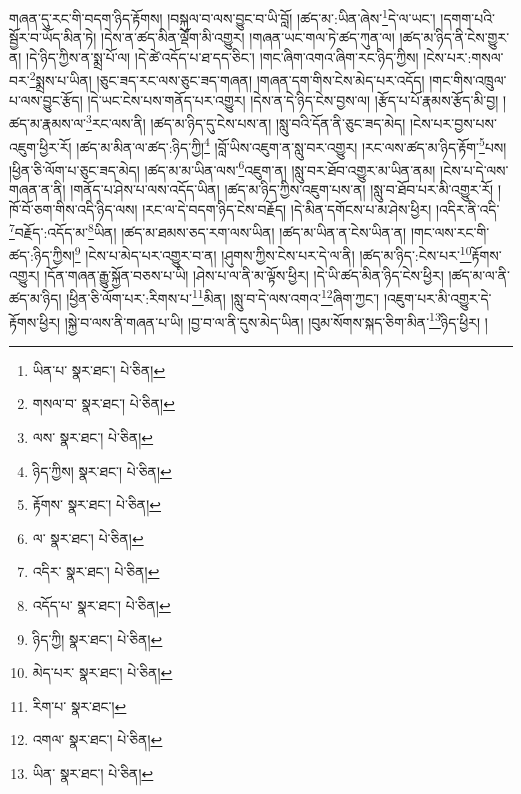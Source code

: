 གཞན་དུ་རང་གི་བདག་ཉིད་རྟོགས། །བསྐུལ་བ་ལས་བྱུང་བ་ཡི་བློ། །ཚད་མ་:ཡིན་ཞེས་\footnote{ཡིན་པ་  སྣར་ཐང་།  པེ་ཅིན། }དེ་ལ་ཡང་། །དགག་པའི་སྦྱོར་བ་ཡོད་མིན་ཏེ། །དེས་ན་ཚད་མིན་ལྡོག་མི་འགྱུར། །གཞན་ཡང་གལ་ཏེ་ཚད་ཀུན་ལ། །ཚད་མ་ཉིད་ནི་ངེས་གྱུར་ན། །དེ་ཉིད་ཀྱིས་ན་སྨྲ་པོ་ལ། །དེ་ཚེ་འདོད་པ་ཐ་དད་ཅིང་། །གང་ཞིག་འགའ་ཞིག་རང་ཉིད་ཀྱིས། །ངེས་པར་:གསལ་བར་\footnote{གསལ་བ་  སྣར་ཐང་།  པེ་ཅིན། }སྨྲས་པ་ཡིན། །ཅུང་ཟད་རང་ལས་ཅུང་ཟད་གཞན། །གཞན་དག་གིས་ངེས་མེད་པར་འདོད། །གང་གིས་འཁྲུལ་པ་ལས་བྱུང་རྩོད། །དེ་ཡང་ངེས་པས་གནོད་པར་འགྱུར། །དེས་ན་དེ་ཉིད་ངེས་བྱས་ལ། །རྩོད་པ་པོ་རྣམས་རྩོད་མི་བྱ། །ཚད་མ་རྣམས་ལ་\footnote{ལས་  སྣར་ཐང་།  པེ་ཅིན། }རང་ལས་ནི། །ཚད་མ་ཉིད་དུ་ངེས་པས་ན། །སླུ་བའི་དོན་ནི་ཅུང་ཟད་མེད། །ངེས་པར་བྱས་པས་འཇུག་ཕྱིར་རོ། །ཚད་མ་མིན་ལ་ཚད་:ཉིད་ཀྱི།\footnote{ཉིད་ཀྱིས།  སྣར་ཐང་།  པེ་ཅིན། } །བློ་ཡིས་འཇུག་ན་སླུ་བར་འགྱུར། །རང་ལས་ཚད་མ་ཉིད་རྟོག་\footnote{རྟོགས་  སྣར་ཐང་།  པེ་ཅིན། }པས། །ཕྱིན་ཅི་ལོག་པ་ཅུང་ཟད་མེད། །ཚད་མ་མ་ཡིན་ལས་\footnote{ལ་  སྣར་ཐང་།  པེ་ཅིན། }འཇུག་ན། །སླུ་བར་ཐོབ་འགྱུར་མ་ཡིན་ནམ། །ངེས་པ་དེ་ལས་གཞན་ན་ནི། །གནོད་པ་ཤེས་པ་ལས་འདོད་ཡིན། །ཚད་མ་ཉིད་ཀྱིས་འཇུག་པས་ན། །སླུ་བ་ཐོབ་པར་མི་འགྱུར་རོ། །ཁོ་བོ་ཅག་གིས་འདི་ཉིད་ལས། །རང་ལ་དེ་བདག་ཉིད་ངེས་བརྗོད། །དེ་མིན་དགོངས་པ་མ་ཤེས་ཕྱིར། །འདིར་ནི་འདི་\footnote{འདིར་  སྣར་ཐང་།  པེ་ཅིན། }བརྗོད་:འདོད་མ་\footnote{འདོད་པ་  སྣར་ཐང་།  པེ་ཅིན། }ཡིན། །ཚད་མ་ཐམས་ཅད་རག་ལས་ཡིན། །ཚད་མ་ཡིན་ན་ངེས་ཡིན་ན། །གང་ལས་རང་གི་ཚད་:ཉིད་ཀྱིས།\footnote{ཉིད་ཀྱི།  སྣར་ཐང་།  པེ་ཅིན། } །ངེས་པ་མེད་པར་འགྱུར་བ་ན། །ཤུགས་ཀྱིས་ངེས་པར་དེ་ལ་ནི། །ཚད་མ་ཉིད་:ངེས་པར་\footnote{མེད་པར་  སྣར་ཐང་།  པེ་ཅིན། }རྟོགས་འགྱུར། །དོན་གཞན་རྒྱུ་སྐྱོན་བཅས་པ་ཡི། །ཤེས་པ་ལ་ནི་མ་ལྟོས་ཕྱིར། །དེ་ཡི་ཚད་མིན་ཉིད་ངེས་ཕྱིར། །ཚད་མ་ལ་ནི་ཚད་མ་ཉིད། །ཕྱིན་ཅི་ལོག་པར་:རིགས་པ་\footnote{རིག་པ་  སྣར་ཐང་། }མིན། །སླུ་བ་དེ་ལས་འགའ་\footnote{འགལ་  སྣར་ཐང་།  པེ་ཅིན། }ཞིག་ཀྱང་། །འཇུག་པར་མི་འགྱུར་དེ་རྟོགས་ཕྱིར། །སྐྱེ་བ་ལས་ནི་གཞན་པ་ཡི། །བྱ་བ་ལ་ནི་དུས་མེད་ཡིན། །བུམ་སོགས་སྐད་ཅིག་མིན་\footnote{ཡིན་  སྣར་ཐང་།  པེ་ཅིན། }ཉིད་ཕྱིར། །
